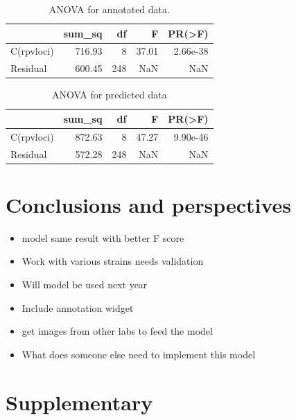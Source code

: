 \documentclass[english]{article}
\begin{document}
\begin{table}[H]
    \centering
    \caption{ANOVA for annotated data.}
    \label{tab:oivannova}
    \begin{tabular}{lrrrr}
        \toprule
        {}         & sum\_sq & df  & F     & PR(>F)   \\
        \midrule
        C(rpvloci) & 716.93  & 8   & 37.01 & 2.66e-38 \\
        Residual   & 600.45  & 248 & NaN   & NaN      \\
        \bottomrule
    \end{tabular}
\end{table}

\begin{table}[H]
    \centering
    \caption{ANOVA for predicted data}
    \label{tab:poivannova}
    \begin{tabular}{lrrrr}
        \toprule
        {}         & sum\_sq & df  & F     & PR(>F)   \\
        \midrule
        C(rpvloci) & 872.63  & 8   & 47.27 & 9.90e-46 \\
        Residual   & 572.28  & 248 & NaN   & NaN      \\
        \bottomrule
    \end{tabular}
\end{table}

\section{Conclusions and perspectives}

\begin{itemize}
    \item model same result with better F score
    \item Work with various strains needs validation
    \item Will model be used next year
    \item Include annotation widget
    \item get images from other labs to feed the model
    \item What does someone else need to implement this model
\end{itemize}

\section{Supplementary}
\end{document}
